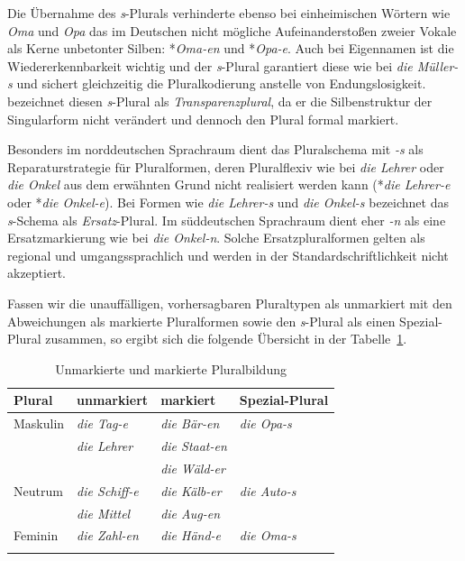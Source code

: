 Die Übernahme des \textit{s}-Plurals verhinderte ebenso bei einheimischen Wörtern wie \textit{Oma} und \textit{Opa} das im Deutschen nicht mögliche Aufeinanderstoßen zweier Vokale als Kerne unbetonter Silben: *\textit{Oma-en} und *\textit{Opa-e}. Auch bei Eigennamen ist die Wiedererkennbarkeit wichtig und der \textit{s}-Plural garantiert diese wie bei \textit{die Müller-s} und sichert gleichzeitig die Pluralkodierung anstelle von Endungslosigkeit. \citet[275]{Wegener2002} bezeichnet diesen \textit{s}-Plural als \textit{Transparenzplural}, da er die Silbenstruktur der Singularform nicht verändert und dennoch den Plural formal markiert.

Besonders im norddeutschen Sprachraum dient das Pluralschema mit \textit{-s} als Reparaturstrategie für Pluralformen, deren Pluralflexiv wie bei \textit{die Lehrer} oder \textit{die Onkel} aus dem erwähnten Grund nicht realisiert werden kann (*\textit{die Lehrer-e} oder *\textit{die Onkel-e}). Bei Formen wie \textit{die Lehrer-s} und \textit{die Onkel-s} bezeichnet \citet[275]{Wegener2002} das \textit{s}-Schema als \textit{Ersatz}-Plural. Im süddeutschen Sprachraum dient eher \textit{-n} als eine Ersatzmarkierung wie bei \textit{die Onkel-n}. Solche Ersatzpluralformen gelten als regional und umgangssprachlich und werden in der Standardschriftlichkeit nicht akzeptiert.  

Fassen wir die unauffälligen, vorhersagbaren Pluraltypen als unmarkiert mit den Abweichungen als markierte Pluralformen sowie den \textit{s}-Plural als einen Spezial-Plural zusammen, so ergibt sich die folgende Übersicht in der Tabelle~\ref{tab:Unmarkierte und markierte Pluralbildung}. 

\begin{table}[t]
  \centering
  \begin{tabular}{l l l l}
    \lsptoprule
    Plural & unmarkiert & markiert & Spezial-Plural \\
    \hline
    
    Maskulin & \textit{die Tag-e} & \textit{die Bär-en} & \textit{die Opa-s} \\
    
    & \textit{die Lehrer} & \textit{die Staat-en} & \\
    
    & & \textit{die Wäld-er} & \\
    
    Neutrum & \textit{die Schiff-e} & \textit{die Kälb-er} & \textit{die Auto-s}  \\
    
    & \textit{die Mittel} & \textit{die Aug-en} & \\
    
    Feminin & \textit{die Zahl-en} & \textit{die Händ-e} & \textit{die Oma-s}  \\
    \lspbottomrule 
  \end{tabular}
  \caption{Unmarkierte und markierte Pluralbildung}
  \label{tab:Unmarkierte und markierte Pluralbildung}
\end{table}


